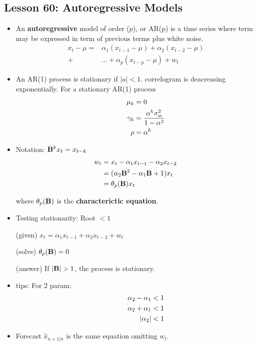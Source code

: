 \documentclass[10pt, french]{article}
\begin{document}
\begin{multicols*}{3}
\section*{Lesson 60: Autoregressive Models}
\begin{itemize}[align=left,leftmargin=*]
    \item An \textbf{autoregressive} model of order ($p$), or AR(p) is a time series where term may be expressed in term of previous terms plus white noise.
    \begin{align*}
    x_t - \mu =& \alpha_1(x_{t-1} - \mu) + \alpha_2(x_{t-2} - \mu) \\ 
    +& ...  + \alpha_p(x_{t-p} - \mu) + w_t
    \end{align*}
    \item An AR(1) process is stationary if $|a|<1$. correlogram is deacreasing exponentially. For a stationary AR(1) process \\
    \begin{align*}
    \hspace*{1cm}
      \mu_k &= 0 \\  
      \gamma_k &= \frac{\alpha^k \sigma_w^2}{1 - \alpha^2} \\
      \rho &= \alpha^k
    \end{align*}
    \item Notation: $\mathbf{B}^kx_t = x_{t-k}$
    \begin{align*}
        w_t &= x_t - \alpha_1 x_{t-1} - \alpha_2 x_{t-2}\\
        &= (\alpha_2\mathbf{B}^2 - \alpha_1\mathbf{B} + 1)x_t \\
        &= \theta_p(\mathbf{B})x_t
    \end{align*}
    \item[] where $\theta_p(\mathbf{B})$ is the \textbf{characterictic equation}. 
    \item Testing stationarity: Root $< 1$
    \item[(given)] $x_t = \alpha_1 x_{t-1} + \alpha_2 x_{t-2} + w_t$
    \item[(solve)] $\theta_p(\mathbf{B}) = 0$  
    \item[(answer)] If $|\mathbf{B}| > 1$, the process is stationary.
    \item tips: For 2 param:
    \begin{align*}
        \hspace*{1cm}
       \alpha_2 - \alpha_1 < 1 \\
       \alpha_2 + \alpha_1 < 1 \\
       |\alpha_2| < 1 
    \end{align*}
    \item Forecast $\hat{x}_{n+1|n}$ is the same equation omitting $w_t$.
\end{itemize}


\end{multicols*}
\end{document}
